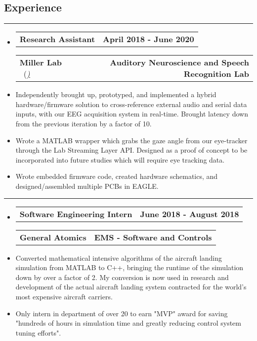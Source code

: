 \documentclass[10pt,letterpaper]{article}
\makeatletter
\newcommand{\items}[2]
{
	\begin{tabular*}{\linewidth}{l @{\extracolsep{\fill}} r}
		#1 & #2 \\
	\end{tabular*}
}
\newcommand{\sectionbreak}
{
	\vspace{-1.2em}
	\rule{\textwidth}{1.7pt}
	\vspace{-1.7em}
}
\makeatother
\begin{document}
\vspace{-1.5em}

\subsection*{Experience}
\sectionbreak



\begin{itemize}
	\item[]
		\items
			{\textbf{Research Assistant}} 
			{\textbf{April 2018 - June 2020}}
		\items
		{\textbf{Miller Lab} \ (\href{https://millerlab.faculty.ucdavis.edu}{\small \emph{\underline{\smash{millerlab.faculty.ucdavis.edu})}}} }
			{\textbf{Auditory Neuroscience and Speech Recognition Lab}} 
		\item
			Independently brought up, prototyped, and implemented a hybrid hardware/firmware solution to cross-reference external audio and serial data inputs, with our EEG acquisition system in real-time. Brought latency down from the previous iteration by a factor of 10. 
		\item 
			Wrote a MATLAB wrapper which grabs the gaze angle from our eye-tracker through the Lab Streaming Layer API. Designed as a proof of concept to be incorporated into future studies which will require eye tracking data.
		\item
			Wrote embedded firmware code, created hardware schematics, and designed/assembled multiple PCBs in EAGLE.
\end{itemize}

\hrule

\begin{itemize}
	\item[]
		\items
			{\textbf{Software Engineering Intern}} 
			{\textbf{June 2018 - August 2018}}
		\items
			{\textbf{General Atomics}}
			{\textbf{EMS - Software and Controls}} 
		\item
			Converted mathematical intensive algorithms of the aircraft landing simulation from MATLAB to C++, bringing the runtime of the simulation down by over a factor of 2. My conversion is now used in research and development of the actual aircraft landing system contracted for the world’s most expensive aircraft carriers.
		\item
			Only intern in department of over 20 to earn "MVP" award for saving "hundreds of hours in simulation time and greatly reducing control system tuning efforts".

\end{itemize}
\end{document}

